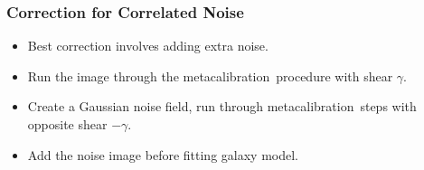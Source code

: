 \documentclass{beamer}
\newcommand{\mcal}{metacalibration}
\begin{document}
\frame
{
    \frametitle{Correction for Correlated Noise}

 
    \begin{itemize}

        \item Best correction involves adding extra noise.

        \item Run the image through the \mcal\ procedure with
            shear $\gamma$.

        \item Create a Gaussian noise field, run through \mcal\ steps with
            opposite shear $-\gamma$.

        \item Add the noise image before fitting galaxy model.

    \end{itemize}

}






\end{document}
